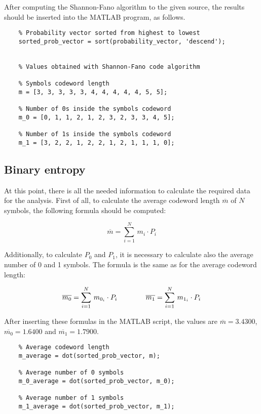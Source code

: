 \FloatBarrier \noindent After computing the Shannon-Fano algorithm to the given source, the results should be inserted into the MATLAB program, as follows.

\begin{lstlisting}
    % Probability vector sorted from highest to lowest
    sorted_prob_vector = sort(probability_vector, 'descend');


    % Values obtained with Shannon-Fano code algorithm

    % Symbols codeword length
    m = [3, 3, 3, 3, 3, 4, 4, 4, 4, 4, 5, 5]; 

    % Number of 0s inside the symbols codeword
    m_0 = [0, 1, 1, 2, 1, 2, 3, 2, 3, 3, 4, 5];

    % Number of 1s inside the symbols codeword
    m_1 = [3, 2, 2, 1, 2, 2, 1, 2, 1, 1, 1, 0];
\end{lstlisting}


\subsection{Binary entropy}
At this point, there is all the needed information to calculate the required data for the analysis. First of all, to calculate the average codeword length $\overline{m}$ of $N$ symbols, the following formula should be computed:

\begin{equation*}
    \overline{m} = \sum_{i = 1}^N\,m_i \cdot P_i 
\end{equation*}

\noindent Additionally, to calculate $P_0$ and $P_1$, it is necessary to calculate also the average number of 0 and 1 symbols. The formula is the same as for the average codeword length:

\begin{equation*}
    \overline{m_0} = \sum_{i = 1}^N\,m_{0_i} \cdot P_i 
    \hspace*{40px}
    \overline{m_1} = \sum_{i = 1}^N\,m_{1_i} \cdot P_i
\end{equation*}

\noindent After inserting these formulas in the MATLAB script, the values are $\overline{m} = 3.4300$, $\overline{m_0} = 1.6400$ and $\overline{m_1} = 1.7900$.

\begin{lstlisting}
    % Average codeword length
    m_average = dot(sorted_prob_vector, m); 

    % Average number of 0 symbols
    m_0_average = dot(sorted_prob_vector, m_0);

    % Average number of 1 symbols
    m_1_average = dot(sorted_prob_vector, m_1);
\end{lstlisting}


